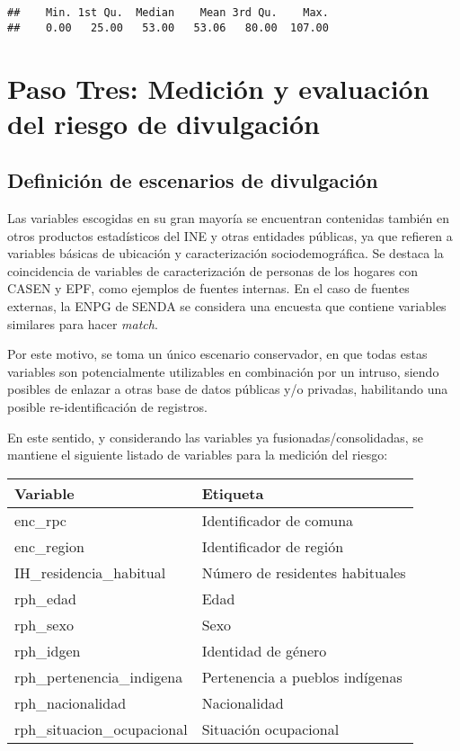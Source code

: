 \documentclass[
]{book}
\theoremstyle{definition}
\theoremstyle{definition}
\theoremstyle{definition}
\theoremstyle{definition}
\theoremstyle{remark}
\begin{document}
\begin{verbatim}
##    Min. 1st Qu.  Median    Mean 3rd Qu.    Max. 
##    0.00   25.00   53.00   53.06   80.00  107.00
\end{verbatim}

\hypertarget{paso-tres-mediciuxf3n-y-evaluaciuxf3n-del-riesgo-de-divulgaciuxf3n}{%
\section{Paso Tres: Medición y evaluación del riesgo de divulgación}\label{paso-tres-mediciuxf3n-y-evaluaciuxf3n-del-riesgo-de-divulgaciuxf3n}}

\hypertarget{definiciuxf3n-de-escenarios-de-divulgaciuxf3n}{%
\subsection{Definición de escenarios de divulgación}\label{definiciuxf3n-de-escenarios-de-divulgaciuxf3n}}

Las variables escogidas en su gran mayoría se encuentran contenidas también en otros productos estadísticos del INE y otras entidades públicas, ya que refieren a variables básicas de ubicación y caracterización sociodemográfica. Se destaca la coincidencia de variables de caracterización de personas de los hogares con CASEN y EPF, como ejemplos de fuentes internas. En el caso de fuentes externas, la ENPG de SENDA se considera una encuesta que contiene variables similares para hacer \emph{match}.

Por este motivo, se toma un único escenario conservador, en que todas estas variables son potencialmente utilizables en combinación por un intruso, siendo posibles de enlazar a otras base de datos públicas y/o privadas, habilitando una posible re-identificación de registros.

En este sentido, y considerando las variables ya fusionadas/consolidadas, se mantiene el siguiente listado de variables para la medición del riesgo:

\begin{longtable}[]{@{}ll@{}}
\toprule()
Variable & Etiqueta \\
\midrule()
\endhead
enc\_rpc & Identificador de comuna \\
enc\_region & Identificador de región \\
IH\_residencia\_habitual & Número de residentes habituales \\
rph\_edad & Edad \\
rph\_sexo & Sexo \\
rph\_idgen & Identidad de género \\
rph\_pertenencia\_indigena & Pertenencia a pueblos indígenas \\
rph\_nacionalidad & Nacionalidad \\
rph\_situacion\_ocupacional & Situación ocupacional \\
\bottomrule()
\end{longtable}
\end{document}
